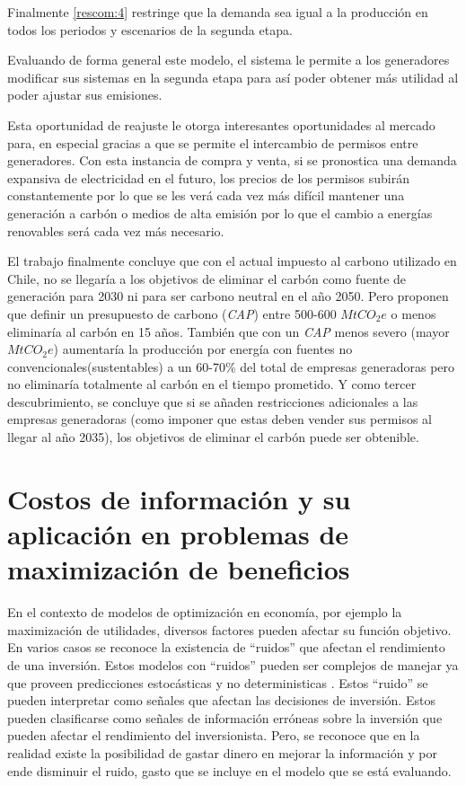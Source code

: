 Finalmente \ref{rescom:4} restringe que la demanda sea igual a la producción en todos los periodos y escenarios de la segunda etapa.
\vspace{2.5mm}

Evaluando de forma general este modelo, el sistema le permite a los generadores modificar sus sistemas en la segunda etapa para así poder obtener más utilidad al poder ajustar sus emisiones.
\vspace{2.5mm}

Esta oportunidad de reajuste le otorga interesantes oportunidades al mercado para, en especial gracias a que se permite el intercambio de permisos entre generadores. Con esta instancia de compra y venta, si se pronostica una demanda expansiva de electricidad en el futuro, los precios de los permisos subirán constantemente por lo que se les verá cada vez más difícil mantener una generación a carbón o medios de alta emisión por lo que el cambio a energías renovables será cada vez más necesario.
\vspace{2.5mm}

El trabajo finalmente concluye que con el actual impuesto al carbono utilizado en Chile, no se llegaría a los objetivos de eliminar el carbón como fuente de generación para 2030 ni para ser carbono neutral en el año 2050. Pero proponen que definir un presupuesto de carbono (\textit{CAP}) entre 500-600 $MtCO_2 e$ o menos eliminaría al carbón en 15 años. También que con un \textit{CAP} menos severo (mayor $MtCO_2 e$) aumentaría la producción por energía con fuentes no convencionales(sustentables) a un 60-70\% del total de empresas generadoras pero no eliminaría totalmente al carbón en el tiempo prometido. Y como tercer descubrimiento, se concluye que si se añaden restricciones adicionales a las empresas generadoras (como imponer que estas deben vender sus permisos al llegar al año 2035), los objetivos de eliminar el carbón puede ser obtenible.

\section{Costos de información y su aplicación en problemas de maximización de beneficios}\label{marco:costos}

En el contexto de modelos de optimización en economía, por ejemplo la maximización de utilidades, diversos factores pueden afectar su función objetivo. En varios casos se reconoce la existencia de ``ruidos'' que afectan el rendimiento de una inversión. Estos modelos con ``ruidos'' pueden ser complejos de manejar ya que proveen predicciones estocásticas y no deterministicas . Estos ``ruido'' se pueden interpretar como señales que afectan las decisiones de inversión. Estos pueden clasificarse como señales de información erróneas sobre la inversión que pueden afectar el rendimiento del inversionista. Pero, se reconoce que en la realidad existe la posibilidad de gastar dinero en mejorar la información y por ende disminuir el ruido, gasto que se incluye en el modelo que se está evaluando.
\vspace{2.5mm}

